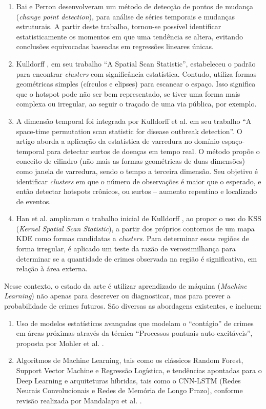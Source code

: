 \begin{enumerate}
  \item{Bai e Perron \cite{BaiAndPerron1998} desenvolveram um método de detecção de pontos de mudança (\textit{change point detection}), para análise de séries temporais e mudanças estruturais. A partir deste trabalho, tornou-se possível identificar estatisticamente os momentos em que uma tendência se altera, evitando conclusões equivocadas baseadas em regressões lineares únicas.}
  \item{Kulldorff \cite{Kulldorff1997}, em seu trabalho ``A Spatial Scan Statistic'', estabeleceu o padrão para encontrar \textit{clusters} com significância estatística. Contudo, utiliza formas geométricas simples (círculos e elipses) para escanear o espaço. Isso significa que o hotspot pode não ser bem representado, se tiver uma forma mais complexa ou irregular, ao seguir o traçado de uma via pública, por exemplo.}
  \item{A dimensão temporal foi integrada por Kulldorff et al. \cite{Kulldorff2005} em seu trabalho ``A space-time permutation scan statistic for disease outbreak detection''. O artigo aborda a aplicação da estatística de varredura no domínio espaço-temporal para detectar surtos de doenças em tempo real. O método propõe o conceito de cilindro (não mais as formas geométricas de duas dimensões) como janela de varredura, sendo o tempo a terceira dimensão. Seu objetivo é identificar \textit{clusters} em que o número de observações é maior que o esperado, e então detectar hotspots crônicos, ou surtos -- aumento repentino e localizado de eventos.}
  \item{Han et al. \cite{Han2019} ampliaram o trabalho inicial de Kulldorff \cite{Kulldorff1997}, ao propor o uso do KSS (\textit{Kernel Spatial Scan Statistic}), a partir dos próprios contornos de um mapa KDE como formas candidatas a \textit{clusters}. Para determinar essas regiões de forma irregular, é aplicado um teste da razão de verossimilhança para determinar se a quantidade de crimes observada na região é significativa, em relação à área externa.}
\end{enumerate}

Nesse contexto, o estado da arte é utilizar aprendizado de máquina (\textit{Machine Learning}) não apenas para descrever ou diagnosticar, mas para prever a probabilidade de crimes futuros. São diversas as abordagens existentes, e incluem:

\begin{enumerate}
  \item{Uso de modelos estatísticos avançados que modelam o ``contágio'' de crimes em áreas próximas através da técnica ``Processos pontuais auto-excitáveis'', proposta por Mohler et al. \cite{Mohler2011}.}
  \item{Algoritmos de Machine Learning, tais como os clássicos Random Forest, Support Vector Machine e Regressão Logística, e tendências apontadas para o Deep Learning e arquiteturas híbridas, tais como o CNN-LSTM (Redes Neurais Convolucionais e Redes de Memória de Longo Prazo), conforme revisão realizada por Mandalapu et al. \cite{Mandalapu2023} .}
\end{enumerate}

